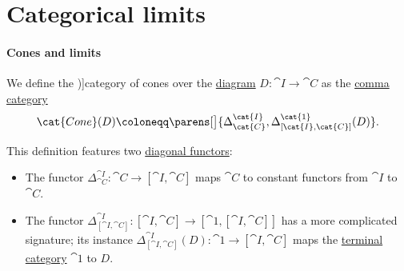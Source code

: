 \section{Categorical limits}\label{sec:categorical_limits}

\paragraph{Cones and limits}

\begin{definition}\label{def:category_of_cones}\mimprovised
  We define the \term[en=category of cones (over \( D \)) (\cite[157]{Perrone2024StartingCategoryTheory})]{category of cones} over the \hyperref[def:categorical_diagram]{diagram} \( D: \cat{I} \to \cat{C} \) as the \hyperref[def:comma_category]{comma category}
  \begin{equation*}
    \cat{Cone}(D) \coloneqq \parens[\big]{ \Delta_{\cat{C}}^{\cat{I}}, \Delta_{[\cat{I}, \cat{C}]}^{\cat{1}}(D) }.
  \end{equation*}

  This definition features two \hyperref[def:diagonal_functor]{diagonal functors}:
  \begin{itemize}
    \item The functor \( \Delta_{\cat{C}}^{\cat{I}}: \cat{C} \to [\cat{I}, \cat{C}] \) maps \( \cat{C} \) to constant functors from \( \cat{I} \) to \( \cat{C} \).

    \item The functor \( \Delta_{[\cat{I}, \cat{C}]}^{\cat{I}}: [\cat{I}, \cat{C}] \to [\cat{1}, [\cat{I}, \cat{C}]] \) has a more complicated signature; its instance \( \Delta_{[\cat{I}, \cat{C}]}^{\cat{I}}(D): \cat{1} \to [\cat{I}, \cat{C}] \) maps the \hyperref[def:singleton_category]{terminal category} \( \cat{1} \) to \( D \).
  \end{itemize}


\end{definition}
